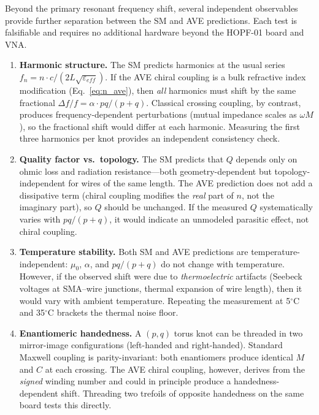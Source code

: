 Beyond the primary resonant frequency shift, several independent observables provide further separation between the SM and AVE predictions. Each test is falsifiable and requires no additional hardware beyond the HOPF-01 board and VNA.

\begin{enumerate}
    \item \textbf{Harmonic structure.} The SM predicts harmonics at the usual series $f_n = n \cdot c/(2L\sqrt{\varepsilon_{eff}})$. If the AVE chiral coupling is a bulk refractive index modification (Eq.~\ref{eq:n_ave}), then \textit{all} harmonics must shift by the same fractional $\Delta f/f = \alpha \cdot pq/(p+q)$. Classical crossing coupling, by contrast, produces frequency-dependent perturbations (mutual impedance scales as $\omega M$), so the fractional shift would differ at each harmonic. Measuring the first three harmonics per knot provides an independent consistency check.

    \item \textbf{Quality factor vs.\ topology.} The SM predicts that $Q$ depends only on ohmic loss and radiation resistance---both geometry-dependent but topology-independent for wires of the same length. The AVE prediction does not add a dissipative term (chiral coupling modifies the \textit{real} part of $n$, not the imaginary part), so $Q$ should be unchanged. If the measured $Q$ systematically varies with $pq/(p+q)$, it would indicate an unmodeled parasitic effect, not chiral coupling.

    \item \textbf{Temperature stability.} Both SM and AVE predictions are temperature-independent: $\mu_0$, $\alpha$, and $pq/(p+q)$ do not change with temperature. However, if the observed shift were due to \textit{thermoelectric} artifacts (Seebeck voltages at SMA--wire junctions, thermal expansion of wire length), then it would vary with ambient temperature. Repeating the measurement at 5$^\circ$C and 35$^\circ$C brackets the thermal noise floor.

    \item \textbf{Enantiomeric handedness.} A $(p,q)$ torus knot can be threaded in two mirror-image configurations (left-handed and right-handed). Standard Maxwell coupling is parity-invariant: both enantiomers produce identical $M$ and $C$ at each crossing. The AVE chiral coupling, however, derives from the \textit{signed} winding number and could in principle produce a handedness-dependent shift. Threading two trefoils of opposite handedness on the same board tests this directly.


\end{enumerate}
